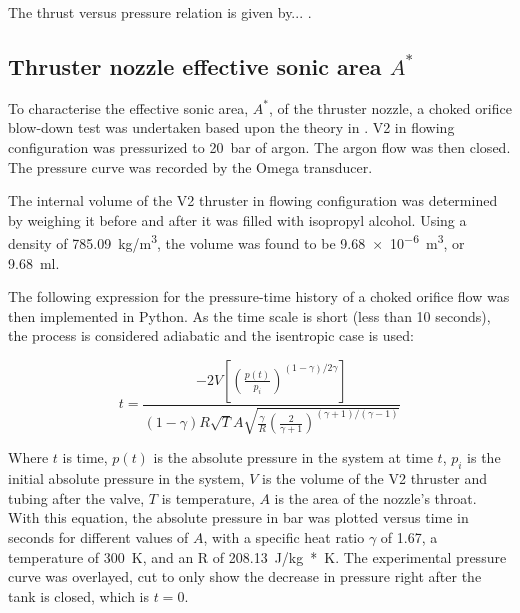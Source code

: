             The thrust versus pressure relation is given by... .

        \subsection{Thruster nozzle effective sonic area $A^*$}

            To characterise the effective sonic area, $A^*$, of the thruster nozzle, a choked orifice blow-down test was undertaken based upon the theory in \textcite{saadCompressibleFluidFlow}. V2 in flowing configuration was pressurized to \qty{20}{bar} of argon. The argon flow was then closed. The pressure curve was recorded by the Omega  transducer.
            


            The internal volume of the V2 thruster in flowing configuration was determined by weighing it before and after it was filled with isopropyl alcohol. Using a density of \qty{785.09}{kg/m^3}, the volume was found to be \qty{9.68e-6}{m^3}, or \qty{9.68}{ml}.

            The following expression for the pressure-time history  of a choked orifice flow was then implemented in Python. As the time scale is short (less than 10 seconds), the process is considered adiabatic and the isentropic case is used:

            \begin{equation}
                t =  \frac{-2V \left[\left(\frac{p(t)}{p_i}\right)^{(1-\gamma) / 2\gamma}\right]}{(1-\gamma) R \sqrt{T} A \sqrt{\frac{\gamma}{R}(\frac{2}{\gamma + 1})^{(\gamma+1) / (\gamma-1)}}}
            \end{equation}

            Where $t$ is time, $p(t)$ is the absolute pressure in the system at time $t$, $p_i$ is the initial absolute pressure in the system, $V$ is the volume of the V2 thruster and tubing after the valve, $T$ is temperature, $A$ is the area of the nozzle's throat.  With this equation, the absolute pressure in bar was plotted versus time in seconds for different values of $A$, with a specific heat ratio $\gamma$ of 1.67, a temperature of \qty{300}{K}, and an R of \qty{208.13}{J/kg*K}. The experimental pressure curve was overlayed, cut to only show the decrease in pressure right after the tank is closed, which is $t=0$.

